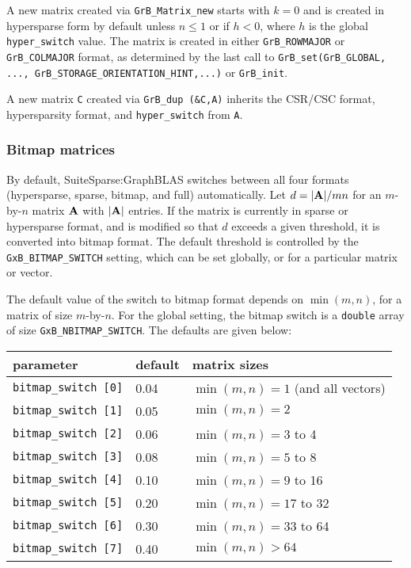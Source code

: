 A new matrix created via \verb'GrB_Matrix_new' starts with $k=0$ and is created
in hypersparse form by default unless $n \le 1$ or if $h<0$, where $h$ is the
global \verb'hyper_switch' value.  The matrix is created in either
\verb'GrB_ROWMAJOR' or \verb'GrB_COLMAJOR' format, as determined by the last call
to
\verb'GrB_set(GrB_GLOBAL,' \verb'..., GrB_STORAGE_ORIENTATION_HINT,...)' or \verb'GrB_init'.

A new matrix \verb'C' created via \verb'GrB_dup (&C,A)' inherits the CSR/CSC
format, hypersparsity format, and \verb'hyper_switch' from \verb'A'.

\subsubsection{Bitmap matrices}
\label{bitmap_switch}

By default, SuiteSparse:GraphBLAS switches between all four formats
(hypersparse, sparse, bitmap, and full) automatically.  Let $d = |{\bf A}|/mn$
for an $m$-by-$n$ matrix $\bf A$ with $|{\bf A}|$ entries.  If the matrix is
currently in sparse or hypersparse format, and is modified so that $d$ exceeds
a given threshold, it is converted into bitmap format.  The default threshold
is controlled by the \verb'GxB_BITMAP_SWITCH' setting, which can be set
globally, or for a particular matrix or vector.

The default value of the switch to bitmap format depends on $\min(m,n)$, for a
matrix of size $m$-by-$n$.  For the global setting, the bitmap switch is a
\verb'double' array of size \verb'GxB_NBITMAP_SWITCH'.  The defaults are given
below:

\vspace{0.2in}
{\small
\begin{tabular}{lll}
parameter & default & matrix sizes \\
\hline
\verb'bitmap_switch [0]' & 0.04 & $\min(m,n) = 1$ (and all vectors) \\
\verb'bitmap_switch [1]' & 0.05 & $\min(m,n) = 2$ \\
\verb'bitmap_switch [2]' & 0.06 & $\min(m,n) = 3$ to 4 \\
\verb'bitmap_switch [3]' & 0.08 & $\min(m,n) = 5$ to 8 \\
\verb'bitmap_switch [4]' & 0.10 & $\min(m,n) = 9$ to 16\\
\verb'bitmap_switch [5]' & 0.20 & $\min(m,n) = 17$ to 32\\
\verb'bitmap_switch [6]' & 0.30 & $\min(m,n) = 33$ to 64 \\
\verb'bitmap_switch [7]' & 0.40 & $\min(m,n) > 64$ \\
\end{tabular}
}
\vspace{0.2in}

